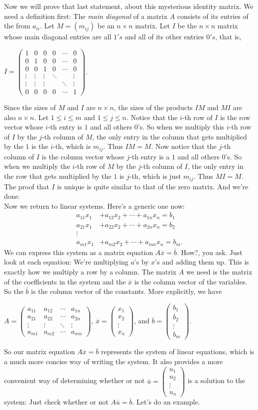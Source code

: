 \documentclass[12pt]{article}
\def\bc{\begin{center}} \def\ec{\end{center}}
\def\bar#1{\overline{#1}}
\def\mtrx#1{\begin{pmatrix}
#1_{11} & #1_{12} & \cdots & #1_{1n} \\
#1_{21} & #1_{22} & \cdots & #1_{2n} \\
\vdots & \vdots & \ddots & \vdots \\
#1_{m1} & #1_{m2} & \cdots & #1_{mn}
\end{pmatrix} }
\def\colm#1{\begin{pmatrix} #1_1 \\ #1_2 \\ \vdots \\ #1_m \end{pmatrix}}
\def\coln#1{\begin{pmatrix} #1_1 \\ #1_2 \\ \vdots \\ #1_n \end{pmatrix}}
\begin{document}
Now we will prove that last statement, about this mysterious identity matrix. We need a definition first: The {\itshape main diagonal} of a matrix $A$ consists of its entries of the from $a_{ii}$. Let $M = (m_{ij})$ be an $n \times n$ matrix. Let $I$ be the $n \times n$ matrix whose main diagonal entries are all $1's$ and all of its other entries $0's$, that is, 
\bc
$I = 
\begin{pmatrix} 1 & 0 & 0 & 0 & \cdots & 0 \\ 
                0 & 1 & 0 & 0 & \cdots & 0 \\ 
                0 & 0 & 1 & 0 & \cdots & 0 \\
		\vdots & \vdots & \vdots & \ddots & \ & \vdots \\
		\vdots & \vdots & \vdots & \      &  \ddots  & \vdots \\
		0 & 0 & 0 & 0 & \cdots & 1
\end{pmatrix}$.
\ec
Since the sizes of $M$ and $I$ are $n \times n$, the sizes of the products $IM$ and $MI$ are also $n \times n$. Let $1 \leq i \leq m$ and $1 \leq j \leq n$. Notice that the $i$-th row of $I$ is the row vector whose $i$-th entry is $1$ and all others $0$'s. So when we multiply this $i$-th row of $I$ by the $j$-th column of $M$, the only entry in the column that gets multiplied by the $1$ is the $i$-th, which is $m_{ij}$. Thus $IM = M$. Now notice that the $j$-th column of $I$ is the column vector whose $j$-th entry is a $1$ and all others $0$'s. So when we multiply the $i$-th row of $M$ by the $j$-th column of $I$, the only entry in the row that gets multiplied by the $1$ is $j$-th, which is just $m_{ij}$. Thus $MI = M$. The proof that $I$ is unique is quite similar to that of the zero matrix. And we're done. \\

Now we return to linear systems. Here's a generic one now:
\begin{align*}
	a_{11}x_1 &+ a_{12}x_2 + \cdots + a_{1n}x_n = b_1 \\
	a_{21}x_1 &+ a_{22}x_2 + \cdots + a_{2n}x_n = b_2 \\
	\vdots  \\
	a_{m1}x_1 &+ a_{m2}x_2 + \cdots + a_{mn}x_n = b_m.
	\end{align*}
We can express this system as a matrix equation $A\bar{x} = \bar{b}$. How?, you ask. Just look at each equation: We're multiplying $a$'s by $x$'s and adding them up. This is exactly how we multiply a row by a column. The matrix $A$ we need is the matrix of the coefficients in the system and the $\bar{x}$ is the column vector of the variables. So the $\bar{b}$ is the column vector of the constants. More explicitly, we have 
\bc
$A = \mtrx{a}$, $\bar{x} = \coln{x}$, and $\bar{b} = \colm{b}$. 
\ec
So our matrix equation $A\bar{x} = \bar{b}$ represents the system of linear equations, which is a much more concise way of writing the system. It also provides a more convenient way of determining whether or not $\bar{u} = \coln{u}$ is a solution to the system: Just check whether or not $A\bar{u} = \bar{b}$. Let's do an example. \\[.05in]
\end{document}
